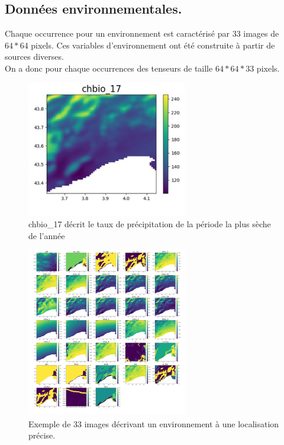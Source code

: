 \documentclass{article}
\begin{document}
\subsection{Données environnementales.}
Chaque occurrence pour un environnement est caractérisé par 33 images de $64*64$ pixels. Ces variables d’environnement ont été construite à partir de sources diverses. \\On a donc pour chaque occurrences des tenseurs de taille $64*64*33$ pixels.
\begin{figure}[H]
	\center
	\includegraphics[width=7cm]{figure/figure2.png} 
	 \caption{chbio\_17 décrit le taux de précipitation de la période la plus sèche de l'année }
\end{figure}
\begin{figure}[H]
	\center
	\includegraphics[width=7cm]{figure/figure3.png} 
	 \caption{Exemple de 33 images décrivant un environnement à une localisation précise.}
\end{figure}
\end{document}

